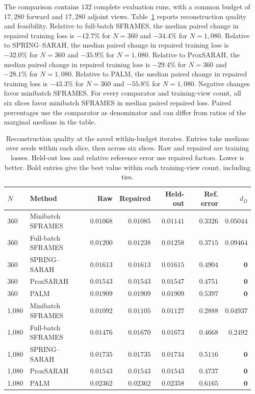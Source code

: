 The comparison contains \(132\) complete evaluation runs, with a common
budget of \(17{,}280\) forward and \(17{,}280\) adjoint views.
Table~\ref{tab:ct-results} reports reconstruction quality and feasibility.
Relative to full-batch SFRAMES, the median paired change in repaired training loss is \(-12.7\%\) for \(N=360\) and \(-34.4\%\) for \(N=1{,}080\). Relative to SPRING--SARAH, the median paired change in repaired training loss is \(-32.0\%\) for \(N=360\) and \(-35.9\%\) for \(N=1{,}080\). Relative to ProxSARAH, the median paired change in repaired training loss is \(-29.4\%\) for \(N=360\) and \(-28.1\%\) for \(N=1{,}080\). Relative to PALM, the median paired change in repaired training loss is \(-43.3\%\) for \(N=360\) and \(-55.8\%\) for \(N=1{,}080\).
Negative changes favor minibatch SFRAMES. For every comparator and training-view count, all six slices favor minibatch SFRAMES in median paired repaired loss.
Paired percentages use the comparator as denominator and can differ from
ratios of the marginal medians in the table.

\begin{table}[!htbp]
\centering
\caption{Reconstruction quality at the saved within-budget iterates. Entries take medians over seeds within each slice, then across six slices. Raw and repaired are training losses. Held-out loss and relative reference error use repaired factors. Lower is better. Bold entries give the best value within each training-view count, including ties.}
\label{tab:ct-results}
\small
\setlength{\tabcolsep}{4pt}
\begin{tabular}{@{}llrrrrr@{}}
\toprule
$N$ & Method & Raw & Repaired & Held-out & Ref. error & $d_D$ \\
\midrule
360 & Minibatch SFRAMES & $\boldsymbol{0.01068}$ & $\boldsymbol{0.01085}$ & $\boldsymbol{0.01141}$ & $\boldsymbol{0.3326}$ & $0.05044$ \\
360 & Full-batch SFRAMES & $0.01200$ & $0.01238$ & $0.01258$ & $0.3715$ & $0.09464$ \\
360 & SPRING--SARAH & $0.01613$ & $0.01613$ & $0.01615$ & $0.4904$ & $\boldsymbol{0}$ \\
360 & ProxSARAH & $0.01543$ & $0.01543$ & $0.01547$ & $0.4751$ & $\boldsymbol{0}$ \\
360 & PALM & $0.01909$ & $0.01909$ & $0.01909$ & $0.5397$ & $\boldsymbol{0}$ \\
1{,}080 & Minibatch SFRAMES & $\boldsymbol{0.01092}$ & $\boldsymbol{0.01105}$ & $\boldsymbol{0.01127}$ & $\boldsymbol{0.2888}$ & $0.04937$ \\
1{,}080 & Full-batch SFRAMES & $0.01476$ & $0.01670$ & $0.01673$ & $0.4668$ & $0.2492$ \\
1{,}080 & SPRING--SARAH & $0.01735$ & $0.01735$ & $0.01734$ & $0.5116$ & $\boldsymbol{0}$ \\
1{,}080 & ProxSARAH & $0.01543$ & $0.01543$ & $0.01543$ & $0.4737$ & $\boldsymbol{0}$ \\
1{,}080 & PALM & $0.02362$ & $0.02362$ & $0.02358$ & $0.6165$ & $\boldsymbol{0}$ \\
\bottomrule
\end{tabular}
\end{table}

